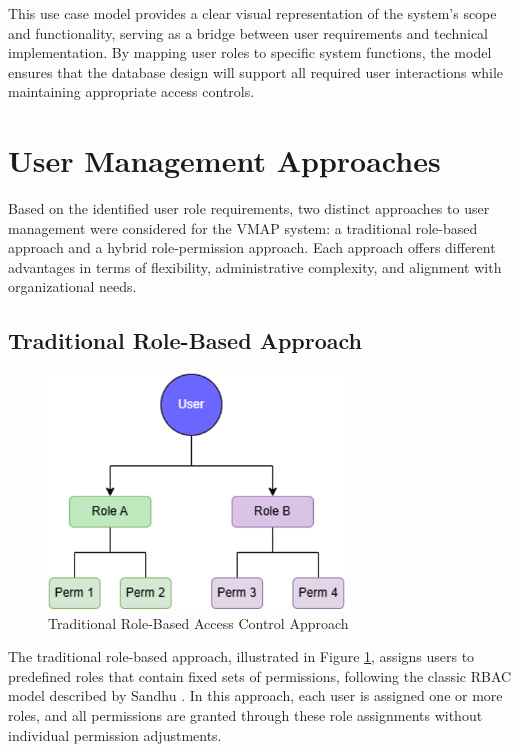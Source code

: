 This use case model provides a clear visual representation of the system's scope and functionality, serving as a bridge between user requirements and technical implementation. By mapping user roles to specific system functions, the model ensures that the database design will support all required user interactions while maintaining appropriate access controls.

\section{User Management Approaches}
\label{sec:user-management-approaches}

Based on the identified user role requirements, two distinct approaches to user management were considered for the \ac{VMAP} system: a traditional role-based approach and a hybrid role-permission approach. Each approach offers different advantages in terms of flexibility, administrative complexity, and alignment with organizational needs.

\subsection{Traditional Role-Based Approach}
\label{subsec:traditional-role-approach}

\begin{figure}[h]
    \centering
    \includegraphics[width=0.7\textwidth]{figures/traditional_rbac_model.png}
    \caption{Traditional Role-Based Access Control Approach}
    \label{fig:traditional-rbac}
\end{figure}

The traditional role-based approach, illustrated in Figure \ref{fig:traditional-rbac}, assigns users to predefined roles that contain fixed sets of permissions, following the classic \ac{RBAC} model described by Sandhu \cite{sandhu1998role}. In this approach, each user is assigned one or more roles, and all permissions are granted through these role assignments without individual permission adjustments.

